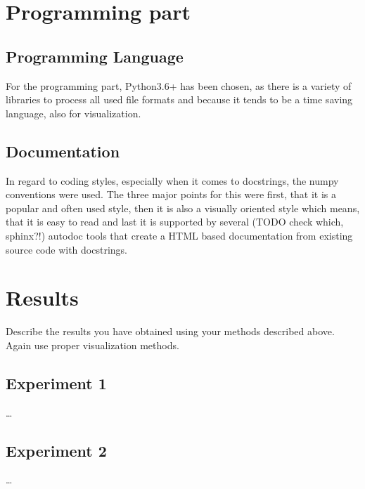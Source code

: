 \section{Programming part}
\label{sec:prog}

\subsection{Programming Language}

For the programming part, Python3.6+ has been chosen, as there is a variety of libraries to process all used file formats and because it tends to be a time saving language, also for visualization.\\

\subsection{Documentation}

In regard to coding styles, especially when it comes to docstrings, the numpy conventions were used. The three major points for this were first, that it is a popular and often used style, then it is also a visually oriented style which means, that it is easy to read and last it is supported by several (TODO check which, sphinx?!) autodoc tools that create a HTML based documentation from existing source code with docstrings.\\


\section{Results}
\label{sec:results}

Describe the results you have obtained using your methods described above. Again use proper visualization methods.

\subsection{Experiment 1}

\dots

\subsection{Experiment 2}

\dots
